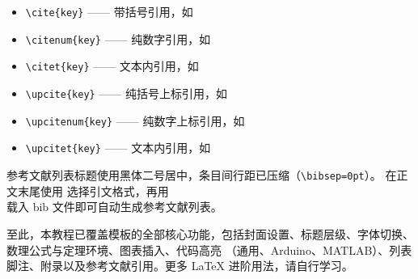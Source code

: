 \documentclass{sysu_report}
\begin{document}
\begin{itemize}
    \item \verb|\cite{key}| —— 带括号引用，如 \cite{razavi2005design}
    \item \verb|\citenum{key}| —— 纯数字引用，如 
    \item \verb|\citet{key}| —— 文本内引用，如 \citet{2003A}
    \item \verb|\upcite{key}| —— 纯括号上标引用，如 
    \item \verb|\upcitenum{key}| —— 纯数字上标引用，如 
    \item \verb|\upcitet{key}| —— 文本内引用，如 
\end{itemize}\par

参考文献列表标题使用黑体二号居中，条目间行距已压缩（\verb|\bibsep=0pt|）。
在正文末尾使用 \verb|| 选择引文格式，再用\\ \verb|| 载入 bib 文件即可自动生成参考文献列表。\par
至此，本教程已覆盖模板的全部核心功能，包括封面设置、标题层级、字体切换、数理公式与定理环境、图表插入、代码高亮
（通用、Arduino、MATLAB）、列表脚注、附录以及参考文献引用。更多 \LaTeX{} 进阶用法，请自行学习。


\end{document}
